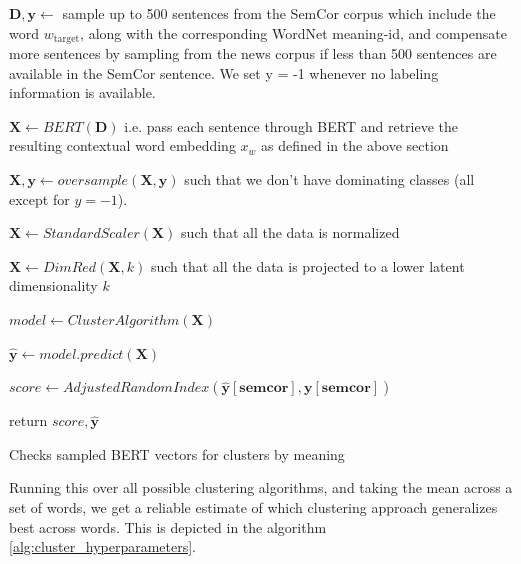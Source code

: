 \documentclass[a4paper,12pt,oneside,openright]{report}
\begin{document}
\begin{algorithm}[H]
\SetAlgoLined
{}

 $\mathbf{D}, \mathbf{y} \leftarrow $  sample up to 500 sentences from the SemCor corpus which include the word $w_{\text{target}}$, along with the corresponding WordNet meaning-id, and compensate more sentences by sampling from the news corpus if less than 500 sentences are available in the SemCor sentence.
We set y = -1 whenever no labeling information is available.\;

$ \mathbf{X} \leftarrow BERT( \mathbf{D} )$ i.e. pass each sentence through BERT and retrieve the resulting contextual word embedding $x_w$ as defined in the above section\;
 
$ \mathbf{X}, \mathbf{y} \leftarrow oversample( \mathbf{X}, \mathbf{y} )$ such that we don't have dominating classes (all except for $y = -1$).\;
 
$ \mathbf{X} \leftarrow StandardScaler( \mathbf{X})$ such that all the data is normalized\;

$ \mathbf{X} \leftarrow DimRed( \mathbf{X}, k )$ such that all the data is projected to a lower latent dimensionality $k$\;

$ model \leftarrow ClusterAlgorithm( \mathbf{X})$ \;

$ \mathbf{\hat{y}} \leftarrow model.predict(\mathbf{X}) $ \;

$ score \leftarrow AdjustedRandomIndex(\mathbf{\hat{y}[semcor]}, \mathbf{y[semcor]}) $ \;

return $ score, \mathbf{\hat{y}}$\;
    
 \caption{Checks sampled BERT vectors for clusters by  meaning}
  \label{alg:cluster_low_level}
\end{algorithm}

\hfill \break

Running this over all possible clustering algorithms, and taking the mean across a set of words, we get a reliable estimate of which clustering approach generalizes best across words.
This is depicted in the algorithm \ref{alg:cluster_hyperparameters}.
\end{document}
